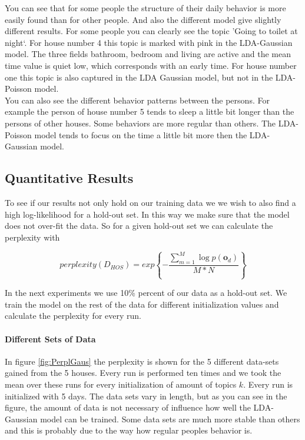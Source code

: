You can see that for some people the structure of their daily behavior is more easily found than for other people. And also the different model give slightly different results.
For some people you can clearly see the topic 'Going to toilet at night`. For house number 4 this topic is marked with pink in the LDA-Gaussian model. The three fields bathroom, bedroom and living are active and the mean time value is quiet low, which corresponds with an early time. For house number one this topic is also captured in the LDA Gaussian model, but not in the LDA-Poisson model.\\
You can also see the different behavior patterns between the persons. For example the person of house number 5 tends to sleep a little bit longer than the persons of other houses. Some behaviors are more regular than others.
The LDA-Poisson model tends to focus on the time a little bit more then the LDA-Gaussian model.


\pagebreak

\subsection{Quantitative Results}
To see if our results not only hold on our training data we we wish to also find a high log-likelihood for a hold-out set. In this way we make sure that the model does not over-fit the data. So for a given hold-out set we can calculate the perplexity with 

\begin{equation}
 perplexity(D_{HOS}) = exp \left\{ - \frac{\sum_{m=1}^M \log p(\textbf{o}_d ) }{M*N} \right\}
\end{equation}

In the next experiments we use 10\% percent of our data as a hold-out set. We train the model on the rest of the data for different initialization values and calculate the perplexity for every run.

\paragraph{Different Sets of Data}
In figure \ref{fig:PerplGaus} the perplexity is shown for the 5 different data-sets gained from the 5 houses. Every run is performed ten times and we took the mean over these runs for every initialization of amount of topics $k$. Every run is initialized with 5 days.
The data sets vary in length, but as you can see in the figure, the amount of data is not necessary of influence how well the LDA-Gaussian model can be trained. Some data sets are much more stable than others and this is probably due to the way how regular peoples behavior is.

